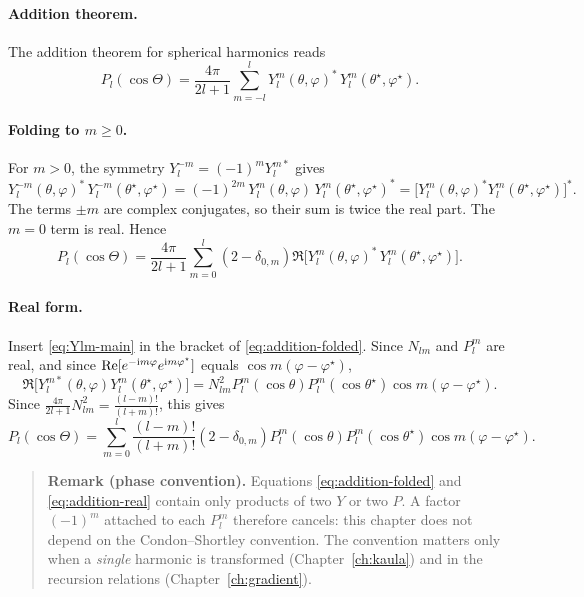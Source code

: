 \paragraph{Addition theorem.} The addition theorem for spherical harmonics \citep[eq.~5.17(9)]{Varshalovich1988} reads
\begin{equation}
  P_l(\cos\Theta)=\frac{4\pi}{2l+1}\sum_{m=-l}^{l}Y_l^{m}(\theta,\varphi)^*\,Y_l^m(\theta^\star,\varphi^\star). \label{eq:addition-full}
\end{equation}

\paragraph{Folding to $m\ge0$.} For $m>0$, the symmetry $Y_l^{-m}=(-1)^mY_l^{m*}$ \citep[eq.~5.1(11)]{Varshalovich1988} gives
\[
  Y_l^{-m}(\theta,\varphi)^*\,Y_l^{-m}(\theta^\star,\varphi^\star)=(-1)^{2m}\,Y_l^m(\theta,\varphi)\,Y_l^{m}(\theta^\star,\varphi^\star)^*=\Big[Y_l^m(\theta,\varphi)^*Y_l^m(\theta^\star,\varphi^\star)\Big]^*.
\]
The terms $\pm m$ are complex conjugates, so their sum is twice the real part. The $m=0$ term is real. Hence
\begin{equation}
  P_l(\cos\Theta)=\frac{4\pi}{2l+1}\sum_{m=0}^{l}(2-\delta_{0,m})\Re\Big[Y_l^m(\theta,\varphi)^*\,Y_l^m(\theta^\star,\varphi^\star)\Big]. \label{eq:addition-folded}
\end{equation}

\paragraph{Real form.} Insert \eqref{eq:Ylm-main} in the bracket of \eqref{eq:addition-folded}. Since $N_{lm}$ and $P_l^m$ are real, and since $\operatorname{Re}[e^{-\mathrm{i} m\varphi}e^{\mathrm{i} m\varphi^\star}]$ equals $\cos m(\varphi-\varphi^\star)$,
\[
  \Re\big[Y_l^{m*}(\theta,\varphi)Y_l^m(\theta^\star,\varphi^\star)\big]=N_{lm}^2P_l^m(\cos\theta)P_l^m(\cos\theta^\star)\cos m(\varphi-\varphi^\star).
\]
Since $\frac{4\pi}{2l+1}N_{lm}^2=\frac{(l-m)!}{(l+m)!}$, this gives
\begin{equation}
  P_l(\cos\Theta)=\sum_{m=0}^{l}\frac{(l-m)!}{(l+m)!}(2-\delta_{0,m})P_l^m(\cos\theta)P_l^m(\cos\theta^\star)\cos m(\varphi-\varphi^\star). \label{eq:addition-real}
\end{equation}

\begin{quote}\small
\textbf{Remark (phase convention).} Equations \eqref{eq:addition-folded} and \eqref{eq:addition-real} contain only products of two $Y$ or two $P$. A factor $(-1)^m$ attached to each $P_l^m$ therefore cancels: this chapter does not depend on the Condon--Shortley convention. The convention matters only when a \emph{single} harmonic is transformed (Chapter~\ref{ch:kaula}) and in the recursion relations (Chapter~\ref{ch:gradient}).
\end{quote}

